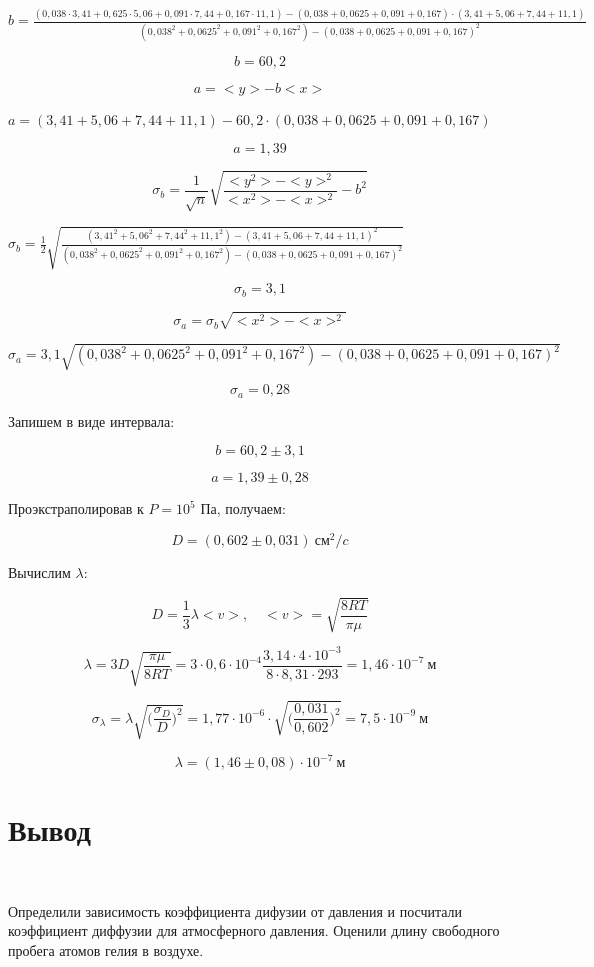 \documentclass[11pt]{article}
\begin{document}
$b = \frac{(0,038 \cdot 3,41 + 0,625 \cdot 5,06 + 0,091 \cdot 7,44 + 0,167 \cdot 11,1) - (0,038 + 0,0625 + 0, 091 + 0,167) \cdot (3,41 + 5,06 + 7,44 + 11,1)}{(0,038^2 + 0,0625^2 + 0,091^2 + 0,167^2) - (0,038 + 0,0625 + 0, 091 + 0,167)^2}$

\[b = 60,2\]

\[a =<y> - b<x>\]

$a = (3,41 + 5,06 + 7,44 + 11,1) - 60,2 \cdot (0,038 + 0,0625 + 0, 091 + 0,167) $

\[a = 1,39\]

\[\sigma_b = \frac{1}{\sqrt{n}} \sqrt { \frac{<y^2> - <y>^2}{<x^2> - <x>^2}  - b^2}\]

$\sigma_b = \frac{1}{2} \sqrt{\frac{(3,41^2 + 5,06^2 + 7,44^2 + 11,1^2) - (3,41 + 5,06 + 7,44 + 11,1)^2}{(0,038^2 + 0,0625^2 + 0,091^2 + 0,167^2) - (0,038 + 0,0625 + 0, 091 + 0,167)^2}}$

\[\sigma_b = 3,1\]

\[\sigma_a = \sigma_b \sqrt{<x^2> - <x>^2}\]

$\sigma_a = 3,1 \sqrt{(0,038^2 + 0,0625^2 + 0,091^2 + 0,167^2) - (0,038 + 0,0625 + 0, 091 + 0,167)^2}$

\[\sigma_a = 0,28\]

Запишем в виде интервала:

\[b = 60,2 \pm 3,1\]

\[a = 1,39 \pm 0,28\]

Проэкстраполировав к $P = 10^5$ Па, получаем:

\[D = (0,602 \pm 0,031) \: \textit{см}^2/\textit{c}\]

Вычислим $\lambda$:

\[D=\frac{1}{3}\lambda <v>, \quad <v>=\sqrt{\frac{8RT}{\pi \mu}}\]

\[\lambda = 3D \sqrt{\frac{\pi \mu}{8RT}} = 3 \cdot 0,6 \cdot 10^{-4} \frac{3,14 \cdot 4 \cdot 10^{-3}}{8\cdot 8,31 \cdot 293} = 1,46 \cdot 10^{-7} \: \textit{м}\]

\[\sigma_{\lambda} = \lambda \sqrt{\Big( \frac{\sigma_D}{D} \Big)^2} = 1,77 \cdot 10^{-6} \cdot \sqrt{\Big( \frac{0,031}{0,602} \Big)^2} = 7,5 \cdot 10^{-9} \: \textit{м}\]

\[\lambda = (1,46 \pm 0,08) \cdot 10^{-7} \: \textit{м}\]


\section*{Вывод}\

Определили зависимость коэффициента дифузии от давления и посчитали коэффициент диффузии для атмосферного давления. Оценили длину свободного пробега атомов гелия в воздухе. 
\end{document}
